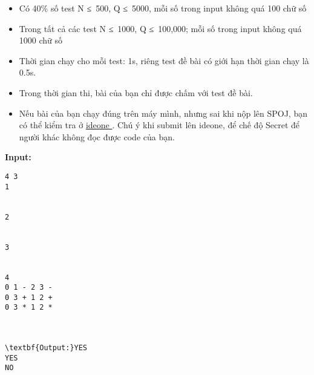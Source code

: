 \begin{itemize}
	\item     Có 40\% số test N ≤ 500, Q ≤ 5000, mỗi số trong input không quá 100 chữ số   
	\item     Trong tất cả các test N ≤ 1000, Q ≤ 100,000; mỗi số trong input không quá 1000 chữ số   
	\item     Thời gian chạy cho mỗi test: 1s, riêng test đề bài có giới hạn thời gian chạy là 0.5s.   
\end{itemize}
\begin{itemize}
	\item     Trong thời gian thi, bài của bạn chỉ được chấm với test đề bài.   
	\item     Nếu bài của bạn chạy đúng trên máy mình, nhưng sai khi nộp lên SPOJ, bạn có thể kiểm tra ở    \href{https://ideone.com}{     ideone    }    . Chú ý khi submit lên ideone, để chế độ Secret để người khác không đọc được code của bạn.   
\end{itemize}
\textbf{    Input:   }
\begin{verbatim}
4 3
1


2


3


4
0 1 - 2 3 -
0 3 + 1 2 +
0 3 * 1 2 *



\textbf{Output:}YES
YES
NO\end{verbatim}